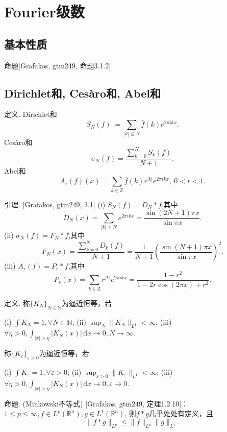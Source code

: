 \newcommand{\supp}{\operatorname{supp}}
\newcommand{\M}{\mathscr{M}}
\section{Fourier级数}
\subsection{基本性质}
命题[Grafakos, gtm249, 命题3.1.2]
\subsection{Dirichlet和, Cesàro和, Abel和}
定义.
    Dirichlet和
    $$S_N(f):=\sum_{|k|\leq N}\hat{f}(k)e^{2 \pi ikx}.$$
    Cesàro和
    $$\sigma_N(f)=\frac{\sum_{k=0}^NS_k(f)}{N+1}.$$
    Abel和
    $$A_r(f)(x)=\sum_{k\in \mathbb{Z}}\hat{f}(k)r^{|k|}e^{2\pi ikx},\ 0<r<1.$$

引理. [Grafakos, gtm249, 3.1]
    (i) $S_N(f)=D_N*f$,其中
    $$D_N(x)=\sum_{|k|\leq N}e^{2 \pi ikx}
    =\frac{\sin(2N+1)\pi x}{\sin \pi x}.$$
    (ii) $\sigma_N(f)=F_N*f$,其中
    $$F_N(x)=\frac{\sum_{k=0}^ND_k(f)}{N+1}
    =\frac{1}{N+1}\left(\frac{\sin (N+1)\pi x}{\sin  \pi x}\right)^2.$$
    (iii) $A_r(f)=P_r*f$,其中
    $$P_r(x)=\sum_{k\in \mathbb{Z}}r^{\left\vert k \right\vert }e^{2\pi ikx}
    =\frac{1-r^2}{1-2r\cos (2\pi x)+r^2}.$$

定义.
    称$\{ K_N \}_{N\in\mathbb{N}}$为逼近恒等，若

    (i) $\int K_N=1,\forall N\in \mathbb{N}$;
    (ii) $\sup_{N}\|K_N\|_{L^1}<\infty$;
    (iii) $\forall \eta>0,\int_{|x|>\eta}|K_N(x)| \,\mathrm{d}x\to 0, N\to \infty$.
    
    称$\{ K_\varepsilon \}_{\varepsilon>0}$为逼近恒等，若

    (i) $\int K_\varepsilon=1,\forall \varepsilon>0$;
    (ii) $\sup_{\varepsilon>0}\|K_\varepsilon\|_{L^1}<\infty$;
    (iii) $\forall \eta>0,\int_{|x|>\eta}|K_N(x)| \,\mathrm{d}x\to 0, \varepsilon\to 0$.

命题. (Minkowski不等式) [Grafakos, gtm249, 定理1.2.10]：
    $1\leq p\leq \infty,f\in L^p(\mathbb{R}^n),g\in L^1(\mathbb{R}^n)$,
    则$f*g$几乎处处有定义，且
    $$\|f*g\|_{L^p}\leq \|f\|_{L^p}\|g\|_{L^1}.$$

